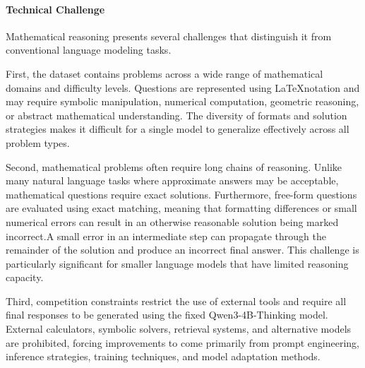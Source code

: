 \documentclass{article}
\begin{document}

\paragraph{Technical Challenge}
Mathematical reasoning presents several challenges that distinguish it from conventional language modeling tasks. 

First, the dataset contains problems across a wide range of mathematical domains and difficulty levels. Questions are represented using \LaTeX \text{ }notation and may require symbolic manipulation, numerical computation, geometric reasoning, or abstract mathematical understanding. The diversity of formats and solution strategies makes it difficult for a single model to generalize effectively across all problem types.

Second, mathematical problems often require long chains of reasoning. Unlike many natural language tasks where approximate answers may be acceptable, mathematical questions require exact solutions. Furthermore, free-form questions are evaluated using exact matching, meaning that formatting differences or small numerical errors can result in an otherwise reasonable solution being marked incorrect.A small error in an intermediate step can propagate through the remainder of the solution and produce an incorrect final answer. This challenge is particularly significant for smaller language models that have limited reasoning capacity.

Third, competition constraints restrict the use of external tools and require all final responses to be generated using the fixed Qwen3-4B-Thinking model. External calculators, symbolic solvers, retrieval systems, and alternative models are prohibited, forcing improvements to come primarily from prompt engineering, inference strategies, training techniques, and model adaptation methods.
\end{document}
